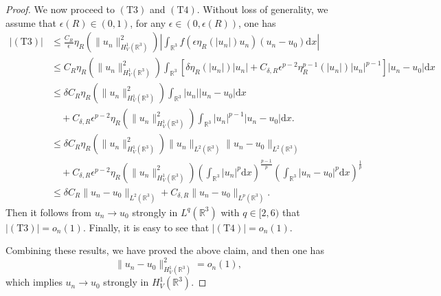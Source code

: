 \documentclass[10pt,a4paper]{amsart}
\begin{document}
\begin{proof}
We now proceed to $(\text{T}3)$ and $(\text{T}4)$. Without loss of generality, we assume that $\epsilon(R)\in(0,1)$, for any $\epsilon\in(0,\epsilon(R))$, one has
\begin{equation*}
    \begin{aligned}
         \left |(\text{T}3)\right |&\leq   \frac{C_{R}}{\epsilon} \eta_R(\|u_n\|_{H^1_V(\mathbb{R}^3)}^2) \left|\int_{\mathbb{R}^3} f(\epsilon \eta_R(|u_n|) u_n) (u_n - u_0) \text{d}x\right|\\
    &\leq   C_{R}\eta_R(\|u_n\|_{H^1_V(\mathbb{R}^3)}^2) \int_{\mathbb{R}^3} \left [ \delta \eta _{R}\left ( \left | u_{n}\right | \right )|u_{n}|+C_{\delta,R } \epsilon^{p-2}\eta _{R}^{p-1}\left ( \left | u_{n}\right |\right )|u_{n}| ^{p-1}\right ]|u_n - u_0|\text{d}x\\
    &\leq\delta C_{R}\eta_R(\|u_n\|_{H^1_V(\mathbb{R}^3)}^2)   \int_{\mathbb{R}^3}|u_{n}||u_{n}-u_{0} |\text{d}x\\
    &\quad+ C_{\delta ,R}\epsilon^{p-2}\eta_R(\|u_n\|_{H^1_V(\mathbb{R}^3)}^2) \int_{\mathbb{R}^3}|u_{n}|^{p-1}|u_{n}-u_{0}|\text{d}x.\\
    &\leq \delta C_{R}\eta_R(\|u_n\|_{H^1_V(\mathbb{R}^3)}^2) \|u_n\|_{L^{2}(\mathbb{R}^3)}\|u_n-u_0\|_{L^{2}(\mathbb{R}^3)}\\
    &\quad+C_{\delta ,R}\epsilon^{p-2}\eta_R(\|u_n\|_{H^1_V(\mathbb{R}^3)}^2) \left ( \int_{\mathbb{R}^3}|u_{n}|^{p} \text{d}x\right )^{\frac{p-1}{p}}\left ( \int_{\mathbb{R}^3}\left | u_{n}-u_{0}\right |^{p}\text{d}x \right )^{\frac{1}{p}}\\
    &\leq \delta C_{R}\|u_n-u_0\|_{L^{2}(\mathbb{R}^3)}+C_{\delta ,R}\|u_n-u_0\|_{L^{p}(\mathbb{R}^3)}.
    \end{aligned}
\end{equation*}
Then it follows from $u_n\to u_0$ strongly in $L^{q}(\mathbb{R}^3)$ with $q\in[2,6)$ that $|(\text{T}3)|=o_{n}\left ( 1 \right ).$ Finally, it is easy to see that $|(\text{T}4)|=o_{n}\left ( 1 \right ).$

Combining these results, we have proved the above claim, and then one has
\begin{equation*}
    \|u_n - u_0\|_{H^1_V(\mathbb{R}^3)}^2=o_{n}\left ( 1 \right ),
\end{equation*}
which implies $u_{n} \to u _{0}$ strongly in $H_{V}^{1}\left ( \mathbb{R}^{3} \right )$.
\end{proof}
\end{document}
